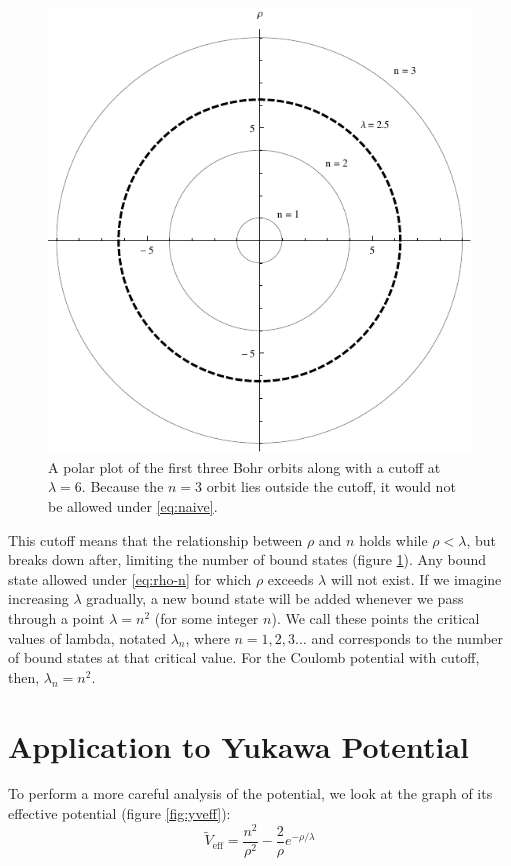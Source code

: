 \documentclass[12pt,twoside]{reedthesis}
\newcommand{\eqn}[1]{\begin{equation}#1\end{equation}}
\newcommand{\fig}[2]{\begin{figure}\begin{center}#1\end{center}#2\end{figure}}
\begin{document}
\fig{
\includegraphics{Figures/cutoff}}
{
\caption[Yukawa orbits with cutoff]{A polar plot of the first three Bohr orbits along with a cutoff at $\lambda = 6$. Because the $n=3$ orbit lies outside the cutoff, it would not be allowed under \eqref{eq:naive}.}
\label{fig:cutoff}
}

This cutoff means that the relationship between $\rho$ and $n$ holds while $\rho < \lambda$, but breaks down after, limiting the number of bound states (figure \ref{fig:cutoff}). Any bound state allowed under \eqref{eq:rho-n} for which $\rho$ exceeds $\lambda$ will not exist. If we imagine increasing $\lambda$ gradually, a new bound state will be added whenever we pass through a point $\lambda = n^2$ (for some integer $n$). We call these points the critical values of lambda, notated $\lambda_{n}$, where $n = 1, 2, 3\ldots$ and corresponds to the number of bound states at that critical value. For the Coulomb potential with cutoff, then, $\lambda_{n} = n^2$.

\section{Application to Yukawa Potential}
To perform a more careful analysis of the potential, we look at the graph of its effective potential (figure \ref{fig:yveff}):
\eqn{
\tilde{V}_{\mathrm{eff}} = \frac{n^2}{\rho^2} - \frac{2}{\rho}e^{-\rho/\lambda}
\label{eq:yveff}
}
 
\end{document}
